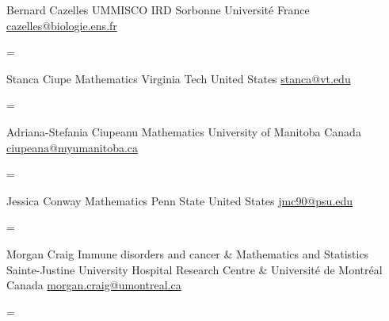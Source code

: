\documentclass[
  letterpaper,
  DIV=11,
  numbers=noendperiod]{scrartcl}
\newenvironment{absolutelynopagebreak}
  {\par\nobreak\vfil\penalty0\vfilneg
   \vtop\bgroup}
  {\par\xdef\tpd{\the\prevdepth}\egroup
   \prevdepth=\tpd}
\begin{document}
\begin{absolutelynopagebreak}Bernard   Cazelles \newline
\mbox{}\quad  UMMISCO \newline
\mbox{}\quad  IRD Sorbonne Université \newline
\mbox{}\quad  France \newline
\mbox{}\quad \href{mailto: cazelles@biologie.ens.fr }{ cazelles@biologie.ens.fr }
\end{absolutelynopagebreak}\vskip0.2cm
\begin{absolutelynopagebreak}Stanca   Ciupe \newline
\mbox{}\quad  Mathematics \newline
\mbox{}\quad  Virginia Tech \newline
\mbox{}\quad  United States \newline
\mbox{}\quad \href{mailto: stanca@vt.edu }{ stanca@vt.edu }
\end{absolutelynopagebreak}\vskip0.2cm
\begin{absolutelynopagebreak}Adriana-Stefania   Ciupeanu \newline
\mbox{}\quad  Mathematics \newline
\mbox{}\quad  University of Manitoba \newline
\mbox{}\quad  Canada \newline
\mbox{}\quad \href{mailto: ciupeana@myumanitoba.ca }{ ciupeana@myumanitoba.ca }
\end{absolutelynopagebreak}\vskip0.2cm
\begin{absolutelynopagebreak}Jessica   Conway \newline
\mbox{}\quad  Mathematics \newline
\mbox{}\quad  Penn State \newline
\mbox{}\quad  United States \newline
\mbox{}\quad \href{mailto: jmc90@psu.edu }{ jmc90@psu.edu }
\end{absolutelynopagebreak}\vskip0.2cm
\begin{absolutelynopagebreak}Morgan   Craig \newline
\mbox{}\quad  Immune disorders and cancer \& Mathematics and Statistics \newline
\mbox{}\quad  Sainte-Justine University Hospital Research Centre \& Université de Montréal \newline
\mbox{}\quad  Canada \newline
\mbox{}\quad \href{mailto: morgan.craig@umontreal.ca }{ morgan.craig@umontreal.ca }
\end{absolutelynopagebreak}\vskip0.2cm
\end{document}
